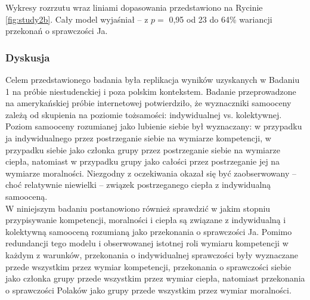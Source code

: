 \documentclass[man]{apa6}
\begin{document}
Wykresy rozrzutu wraz liniami dopasowania przedstawiono na Rycinie \ref{fig:study2b}. Cały model wyjaśniał -- z $p =$ 0,95 od 23 do 64\% wariancji przekonań o sprawczości Ja.\\

\begin{figure*}[htbp]
   \centering
   \caption{Przypisywanie sobie (ja vs. ja jako Amerykanin vs. my Amerykanie) cech związanych w wymiarami kompetencji, moralności i ciepła, a poziom przekonań o własnej sprawczości. Punkty oznaczają latentne wyniki dla każdej osoby, z kreskami oznaczającymi błędy pomiarowe. Grubą linią przerywaną oznaczono najlepsze dopasowanie uzyskane w modelu regresyjnym, z cieńszymi liniami oznaczającymi błąd oszacowania.}

   \label{fig:study2b}
\end{figure*}


\subsubsection{Dyskusja}
Celem przedstawionego badania była replikacja wyników uzyskanych w Badaniu 1 na próbie niestudenckiej i poza polskim kontekstem. Badanie przeprowadzone na amerykańskiej próbie internetowej potwierdziło, że wyznaczniki samooceny zależą od skupienia na poziomie tożsamości: indywidualnej vs. kolektywnej.\\
Poziom samooceny rozumianej jako lubienie siebie był wyznaczany: w przypadku ja indywidualnego przez postrzeganie siebie na wymiarze kompetencji, w przypadku siebie jako członka grupy przez postrzeganie siebie na wymiarze ciepła, natomiast w przypadku grupy jako całości przez postrzeganie jej na wymiarze moralności. Niezgodny z oczekiwania okazał się być zaobserwowany -- choć relatywnie niewielki -- związek postrzeganego ciepła z indywidualną samooceną. \\

W niniejszym badaniu postanowiono również sprawdzić w jakim stopniu przypisywanie kompetencji, moralności i ciepła są związane z indywidualną i kolektywną samooceną rozumianą jako przekonania o sprawczości Ja. Pomimo redundancji tego modelu i obserwowanej istotnej roli wymiaru kompetencji w każdym z warunków, przekonania o indywidualnej sprawczości były wyznaczane przede wszystkim przez wymiar kompetencji, przekonania o sprawczości siebie jako członka grupy przede wszystkim przez wymiar ciepła, natomiast przekonania o sprawczości Polaków jako grupy przede wszystkim przez wymiar moralności.\\
\end{document}
